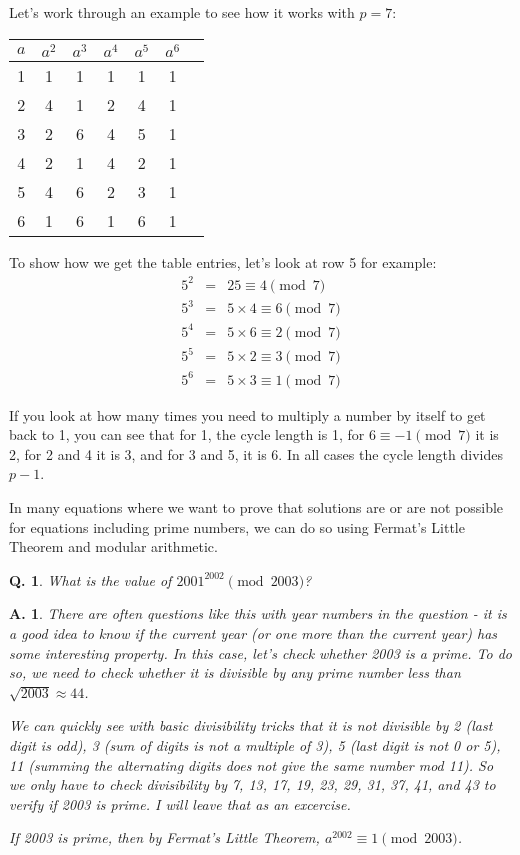 \documentclass{article}
\newtheorem{question}{Q.}
\newtheorem{answer}{A.}
\begin{document}
Let's work through an example to see how it works with $p=7$:

\begin{table}[htb]
\begin{tabular}{|c|c|c|c|c|c|c| }
\hline
	$a$ & $a^2$ & $a^3$ & $a^4$ & $a^5$ & $a^6$ \\
\hline  
	1 & 1 & 1 & 1 & 1 & 1 \\
	2 & 4 & 1 & 2 & 4 & 1 \\
	3 & 2 & 6 & 4 & 5 & 1 \\
	4 & 2 & 1 & 4 & 2 & 1 \\
	5 & 4 & 6 & 2 & 3 & 1 \\
	6 & 1 & 6 & 1 & 6 & 1 \\
\hline  
\end{tabular}
\end{table}

To show how we get the table entries, let's look at row 5 for example:
\begin{eqnarray*}
	5^2 &=& 25 \equiv 4 \pmod{7}\\
	5^3 &=& 5 \times 4 \equiv 6 \pmod{7} \\
	5^4 &=& 5 \times 6 \equiv 2 \pmod{7} \\
	5^5 &=& 5 \times 2 \equiv 3 \pmod{7} \\
	5^6 &=& 5 \times 3 \equiv 1 \pmod{7}
\end{eqnarray*}

If you look at how many times you need to multiply a number by itself to get back to 1, you can
see that for 1, the cycle length is 1, for $6\equiv-1 \pmod{7}$ it is 2, for 2 and 4 it is 3,
and for 3 and 5, it is 6. In all cases the cycle length divides $p-1$.

In many equations where we want to prove that solutions are or are not possible for equations
including prime numbers, we can do so using Fermat's Little Theorem and modular arithmetic.

\begin{question} 
What is the value of $2001^{2002} \pmod{2003}$?
\end{question}

\begin{answer}
	There are often questions like this with year numbers in the question - it is a good idea to
	know if the current year (or one more than the current year) has some interesting property.
	In this case, let's check whether 2003 is a prime. To do so, we need to check whether it
	is divisible by any prime number less than $\sqrt{2003} \approx 44$.

	We can quickly see with basic divisibility tricks that it is not divisible by 2 (last
	digit is odd), 3 (sum of digits is not a multiple of 3), 5 (last digit is not 0 or 5), 11
	(summing the alternating digits does not give the same number mod 11). So we only have to
	check divisibility by 7, 13, 17, 19, 23, 29, 31, 37, 41, and 43 to verify if 2003 is prime.
	I will leave that as an excercise.

	If 2003 is prime, then by Fermat's Little Theorem, $a^2002 \equiv 1 \pmod{2003}$.
\end{answer}
\end{document}
